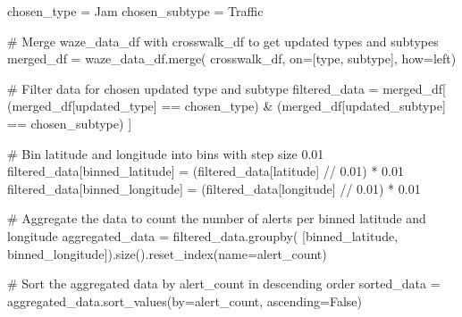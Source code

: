 \documentclass[
  letterpaper,
  DIV=11,
  numbers=noendperiod]{scrartcl}
\newenvironment{Shaded}{\begin{snugshade}}{\end{snugshade}}
\newcommand{\CommentTok}[1]{\textcolor[rgb]{0.37,0.37,0.37}{#1}}
\newcommand{\FloatTok}[1]{\textcolor[rgb]{0.68,0.00,0.00}{#1}}
\newcommand{\NormalTok}[1]{\textcolor[rgb]{0.00,0.23,0.31}{#1}}
\newcommand{\OperatorTok}[1]{\textcolor[rgb]{0.37,0.37,0.37}{#1}}
\newcommand{\StringTok}[1]{\textcolor[rgb]{0.13,0.47,0.30}{#1}}
\newcommand{\VariableTok}[1]{\textcolor[rgb]{0.07,0.07,0.07}{#1}}
\begin{document}
\begin{Shaded}
\begin{Highlighting}[]
\NormalTok{chosen\_type }\OperatorTok{=} \StringTok{\textquotesingle{}Jam\textquotesingle{}}
\NormalTok{chosen\_subtype }\OperatorTok{=} \StringTok{\textquotesingle{}Traffic\textquotesingle{}}

\CommentTok{\# Merge waze\_data\_df with crosswalk\_df to get updated types and subtypes}
\NormalTok{merged\_df }\OperatorTok{=}\NormalTok{ waze\_data\_df.merge(}
\NormalTok{    crosswalk\_df, on}\OperatorTok{=}\NormalTok{[}\StringTok{\textquotesingle{}type\textquotesingle{}}\NormalTok{, }\StringTok{\textquotesingle{}subtype\textquotesingle{}}\NormalTok{], how}\OperatorTok{=}\StringTok{\textquotesingle{}left\textquotesingle{}}\NormalTok{)}

\CommentTok{\# Filter data for chosen updated type and subtype}
\NormalTok{filtered\_data }\OperatorTok{=}\NormalTok{ merged\_df[}
\NormalTok{    (merged\_df[}\StringTok{\textquotesingle{}updated\_type\textquotesingle{}}\NormalTok{] }\OperatorTok{==}\NormalTok{ chosen\_type) }\OperatorTok{\&}
\NormalTok{    (merged\_df[}\StringTok{\textquotesingle{}updated\_subtype\textquotesingle{}}\NormalTok{] }\OperatorTok{==}\NormalTok{ chosen\_subtype)}
\NormalTok{]}

\CommentTok{\# Bin latitude and longitude into bins with step size 0.01}
\NormalTok{filtered\_data[}\StringTok{\textquotesingle{}binned\_latitude\textquotesingle{}}\NormalTok{] }\OperatorTok{=}\NormalTok{ (filtered\_data[}\StringTok{\textquotesingle{}latitude\textquotesingle{}}\NormalTok{] }\OperatorTok{//} \FloatTok{0.01}\NormalTok{) }\OperatorTok{*} \FloatTok{0.01}
\NormalTok{filtered\_data[}\StringTok{\textquotesingle{}binned\_longitude\textquotesingle{}}\NormalTok{] }\OperatorTok{=}\NormalTok{ (filtered\_data[}\StringTok{\textquotesingle{}longitude\textquotesingle{}}\NormalTok{] }\OperatorTok{//} \FloatTok{0.01}\NormalTok{) }\OperatorTok{*} \FloatTok{0.01}

\CommentTok{\# Aggregate the data to count the number of alerts per binned latitude and longitude}
\NormalTok{aggregated\_data }\OperatorTok{=}\NormalTok{ filtered\_data.groupby(}
\NormalTok{    [}\StringTok{\textquotesingle{}binned\_latitude\textquotesingle{}}\NormalTok{, }\StringTok{\textquotesingle{}binned\_longitude\textquotesingle{}}\NormalTok{]).size().reset\_index(name}\OperatorTok{=}\StringTok{\textquotesingle{}alert\_count\textquotesingle{}}\NormalTok{)}

\CommentTok{\# Sort the aggregated data by alert\_count in descending order}
\NormalTok{sorted\_data }\OperatorTok{=}\NormalTok{ aggregated\_data.sort\_values(by}\OperatorTok{=}\StringTok{\textquotesingle{}alert\_count\textquotesingle{}}\NormalTok{, ascending}\OperatorTok{=}\VariableTok{False}\NormalTok{)}


\end{Highlighting}
\end{Shaded}
\end{document}
